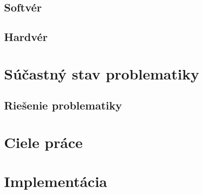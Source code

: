 \subsection{Softvér}%

\subsection{Hardvér}%
\label{ssec:hw}

\section{Súčastný stav problematiky}%

\subsection{Riešenie problematiky}%

\section{Ciele práce}%

\section{Implementácia}%



